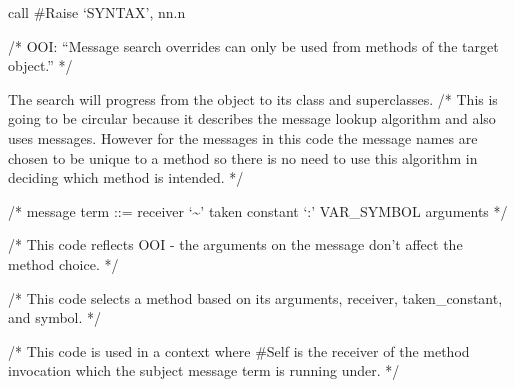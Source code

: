 call \#Raise `SYNTAX', nn.n

/* OOI: ``Message search overrides can only be used from methods of the
target object.'' */

The search will progress from the object to its class and superclasses.
/* This is going to be circular because it describes the message lookup
algorithm and also uses messages. However for the messages in this code
the message names are chosen to be unique to a method so there is no
need to use this algorithm in deciding which method is intended. */

/* message term ::= receiver `\textasciitilde{}' taken constant `:'
VAR\_SYMBOL arguments */

/* This code reflects OOI - the arguments on the message don't affect
the method choice. */

/* This code selects a method based on its arguments, receiver,
taken\_constant, and symbol. */

/* This code is used in a context where \#Self is the receiver of the
method invocation which the subject message term is running under. */


